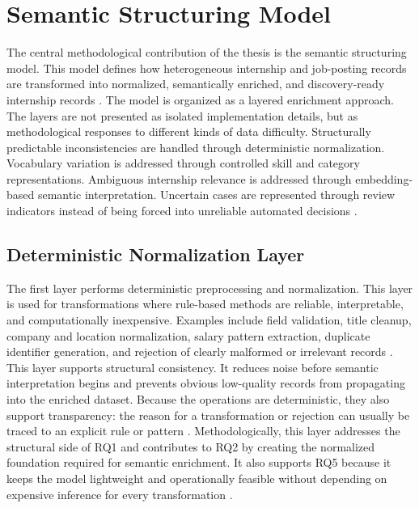 \section{Semantic Structuring Model}

The central methodological contribution of the thesis is the semantic structuring model. This model defines how
heterogeneous internship and job-posting records are transformed into normalized, semantically enriched, and
discovery-ready internship records \cite{sarawagi2008information, batini2009methodologies}.
The model is organized as a layered enrichment approach. The layers are not presented as isolated
implementation details, but as methodological responses to different kinds of data difficulty. Structurally
predictable inconsistencies are handled through deterministic normalization. Vocabulary variation is addressed
through controlled skill and category representations. Ambiguous internship relevance is addressed through
embedding-based semantic interpretation. Uncertain cases are represented through review indicators instead of
being forced into unreliable automated decisions \cite{reimers2019sentence, hunkenschroer2022ethics}.

\subsection{Deterministic Normalization Layer}

The first layer performs deterministic preprocessing and normalization. This layer is used for transformations
where rule-based methods are reliable, interpretable, and computationally inexpensive. Examples include field
validation, title cleanup, company and location normalization, salary pattern extraction, duplicate identifier
generation, and rejection of clearly malformed or irrelevant records \cite{sarawagi2008information, chu2016data}.
This layer supports structural consistency. It reduces noise before semantic interpretation begins and prevents
obvious low-quality records from propagating into the enriched dataset. Because the operations are
deterministic, they also support transparency: the reason for a transformation or rejection can usually be traced
to an explicit rule or pattern \cite{batini2009methodologies}.
Methodologically, this layer addresses the structural side of RQ1 and contributes to RQ2 by creating the
normalized foundation required for semantic enrichment. It also supports RQ5 because it keeps the model
lightweight and operationally feasible without depending on expensive inference for every transformation \cite{schwartz2020green, menghani2023efficient}.


